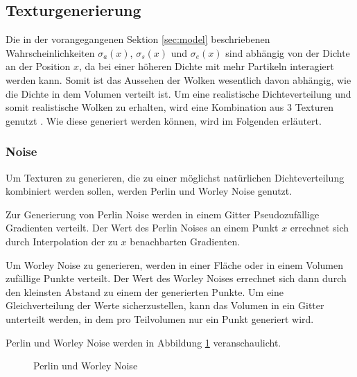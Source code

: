 \subsection{Texturgenerierung}
Die in der vorangegangenen Sektion \ref{sec:model} beschriebenen Wahrscheinlichkeiten $ \sigma_a(x) $, $ \sigma_s(x) $ und $ \sigma_e(x) $ sind abhängig von der Dichte an der Position $ x $, da bei einer höheren Dichte mit mehr Partikeln interagiert werden kann. Somit ist das Aussehen der Wolken wesentlich davon abhängig, wie die Dichte in dem Volumen verteilt ist. Um eine realistische Dichteverteilung und somit realistische Wolken zu erhalten, wird eine Kombination aus 3 Texturen genutzt \cite{Högfeldt16}. Wie diese generiert werden können, wird im Folgenden erläutert.

\subsubsection{Noise}
Um Texturen zu generieren, die zu einer möglichst natürlichen Dichteverteilung kombiniert werden sollen,
werden Perlin und Worley Noise genutzt.

Zur Generierung von Perlin Noise \cite{Perlin85} werden in einem Gitter Pseudozufällige Gradienten verteilt. Der Wert des Perlin Noises an einem Punkt $ x $ errechnet sich durch Interpolation der zu $ x $ benachbarten Gradienten.

Um Worley Noise zu generieren, werden in einer Fläche oder in einem Volumen zufällige Punkte verteilt. Der Wert des Worley Noises errechnet sich dann durch den kleinsten Abstand zu einem der generierten Punkte. Um eine Gleichverteilung der Werte sicherzustellen, kann das Volumen in ein Gitter unterteilt werden, in dem pro Teilvolumen nur ein Punkt generiert wird.

Perlin und Worley Noise werden in Abbildung \ref{fig:noise} veranschaulicht.

\begin{figure}[H]
    \centering
    \qquad
    \caption{Perlin und Worley Noise}
    \label{fig:noise}
\end{figure}


